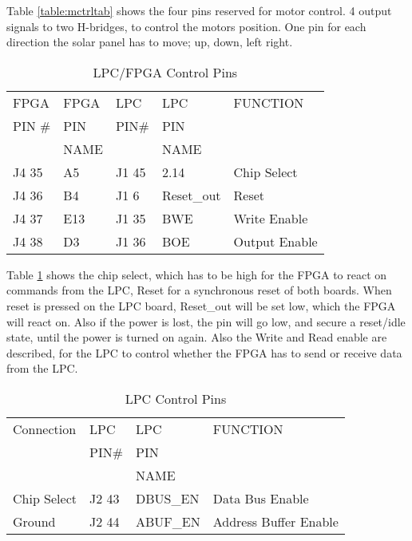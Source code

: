 Table \ref{table:mctrltab} shows the four pins reserved for motor control. 4 output signals to two H-bridges, to control the motors position. One pin for each direction the solar panel has to move; up, down, left right. 


\begin{table}[H]
\begin{center}
\caption{LPC/FPGA Control Pins}
\begin{tabular}{|l|l||l|l||l|}
\hline FPGA & FPGA & LPC & LPC & FUNCTION \\ 
PIN \# & PIN & PIN\# & PIN & \\
 & NAME &  & NAME & \\
\hline J4 35 & A5 & J1 45 & 2.14 & Chip Select \\ 
\hline J4 36 & B4 & J1 6 & Reset\_out & Reset \\ 
\hline J4 37 & E13 & J1 35 & BWE & Write Enable \\ 
\hline J4 38 & D3 & J1 36 & BOE & Output Enable \\ 
\hline 
\end{tabular} 
\label{table:lpctab} %
\end{center}
\end{table}

Table \ref{table:lpctab} shows the chip select, which has to be high for the FPGA to react on commands from the LPC, Reset for a synchronous reset of both boards. When reset is pressed on the LPC board, Reset\_out will be set low, which the FPGA will react on. Also if the power is lost, the pin will go low, and secure a reset/idle state, until the power is turned on again. Also the Write and Read enable are described, for the LPC to control whether the FPGA has to send or receive data from the LPC. 


\begin{table}[H]
\begin{center}
\caption{LPC Control Pins}
\begin{tabular}{|l||l|l||l|}
\hline  Connection 	& LPC 	& LPC 	& FUNCTION \\ 
 	 				& PIN\# & PIN 	& \\
 	 				&  		& NAME 	& \\
\hline  Chip Select	& J2 43 & DBUS\_EN & Data Bus Enable \\
\hline  Ground		& J2 44 & ABUF\_EN & Address Buffer Enable \\
\hline 
\end{tabular} 
\label{table:bustab} %
\end{center}
\end{table}

